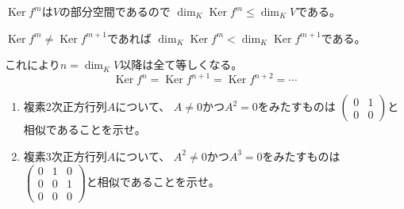\documentclass[12pt,b5paper]{ltjsarticle}
\newcommand{\Ker}{\mathop{\mathrm{Ker}}\nolimits}
\begin{document}
\begin{enumerate}
      $\Ker f^m$は$V$の部分空間であるので
      $\dim_K \Ker f^m \leq \dim_K V$である。

      $\Ker f^m \ne \Ker f^{m+1}$であれば
      $\dim_K \Ker f^m < \dim_K \Ker f^{m+1}$である。

      これにより$n=\dim_K V$以降は全て等しくなる。
      \begin{equation}
       \Ker f^n = \Ker f^{n+1} = \Ker f^{n+2} = \cdots
      \end{equation}



\end{enumerate}

\hrulefill

\begin{enumerate}
 \item
      複素2次正方行列$A$について、
      $A\ne 0$かつ$A^2=0$をみたすものは
      $\begin{pmatrix} 0 & 1 \\ 0 & 0 \end{pmatrix}$と相似であることを示せ。
 \item
      複素3次正方行列$A$について、
      $A^2\ne 0$かつ$A^3=0$をみたすものは
      $\begin{pmatrix} 0 & 1 & 0 \\ 0 & 0 & 1 \\ 0 & 0 & 0 \end{pmatrix}$と相似であることを示せ。
\end{enumerate}

\dotfill
\end{document}
